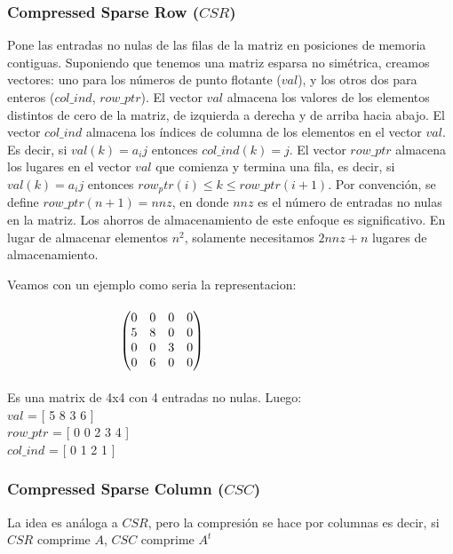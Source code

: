 \subsubsection{Compressed Sparse Row ($CSR$)}

Pone las entradas no nulas de las filas de la matriz en posiciones de memoria contiguas. Suponiendo que tenemos una matriz esparsa no simétrica, creamos vectores: uno para los números de punto flotante ($val$), y los otros dos para enteros ($col\_ind$, $row\_ptr$). El vector $val$ almacena los valores de los elementos distintos de cero de la matriz, de izquierda a derecha y de arriba hacia abajo. El vector $col\_ind$ almacena los índices de columna de los elementos en el vector $val$. Es decir, si $val(k) = a_ij$ entonces $col\_ind(k) = j$. El vector $row\_ptr$ almacena los lugares en el vector $val$ que comienza y termina una fila, es decir, si $val(k) = a_ij$ entonces $row_ptr(i) \leq k \leq row\_ptr(i+1)$. Por convención, se define $row\_ptr(n+1) = nnz$, en donde $nnz$ es el número de entradas no nulas en la matriz. Los ahorros de almacenamiento de este enfoque es significativo. En lugar de almacenar elementos $n^2$, solamente necesitamos $2nnz + n$ lugares de almacenamiento.

Veamos con un ejemplo como seria la representacion:
\\\\
$\hspace{3.2cm}\begin{pmatrix} 0 & 0 & 0 & 0 \\ 5 & 8 & 0 & 0 \\ 0 & 0 & 3 & 0 \\ 0 & 6 & 0 & 0 \\ \end{pmatrix}$
\\\\
Es una matrix de 4x4 con 4 entradas no nulas. Luego:\\
   
   $val$  = [ 5 8 3 6 ] \\
   $row\_ptr$ = [ 0 0 2 3 4 ] \\
   $col\_ind$ = [ 0 1 2 1 ] \\

\subsubsection{Compressed Sparse Column ($CSC$)}

La idea es análoga a $CSR$, pero la compresión se hace por columnas es decir, si $CSR$ comprime $A$, $CSC$ comprime $A^t$  

